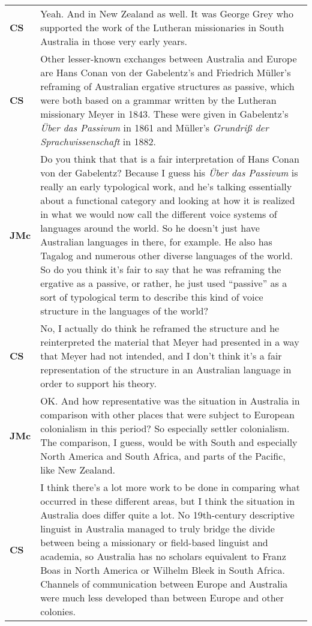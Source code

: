 \documentclass[12pt]{article}
\begin{document}
\begin{flushleft}
\begin{supertabular}{m{0.24415985in}m{5.89766in}}
\textbf{CS}\newline
 &
Yeah. And in New Zealand as well. It was George Grey who supported the work of the Lutheran missionaries in South Australia in those very early years.\\
\textbf{CS}\newline
 &
Other lesser-known exchanges between Australia and Europe are Hans Conan von der Gabelentz’s and Friedrich Müller’s reframing of Australian ergative structures as passive, which were both based on a grammar written by the Lutheran missionary Meyer in 1843. These were given in Gabelentz’s \textit{Über das Passivum} in 1861 and Müller’s \textit{Grundriß der Sprachwissenschaft} in 1882.\\
\textbf{JMc}\newline
 &
Do you think that that is a fair interpretation of Hans Conan von der Gabelentz? Because I guess his \textit{Über das Passivum} is really an early typological work, and he’s talking essentially about a functional category and looking at how it is realized in what we would now call the different voice systems of languages around the world. So he doesn’t just have Australian languages in there, for example. He also has Tagalog and numerous other diverse languages of the world. So do you think it’s fair to say that he was reframing the ergative as a passive, or rather, he just used “passive” as a sort of typological term to describe this kind of voice structure in the languages of the world?\\
\textbf{CS}\newline
 &
No, I actually do think he reframed the structure and he reinterpreted the material that Meyer had presented in a way that Meyer had not intended, and I don’t think it’s a fair representation of the structure in an Australian language in order to support his theory.\\
\textbf{JMc}\newline
 &
OK. And how representative was the situation in Australia in comparison with other places that were subject to European colonialism in this period? So especially settler colonialism. The comparison, I guess, would be with South and especially North America and South Africa, and parts of the Pacific, like New Zealand.\\
\textbf{CS}\newline
 &
I think there’s a lot more work to be done in comparing what occurred in these different areas, but I think the situation in Australia does differ quite a lot. No 19th-century descriptive linguist in Australia managed to truly bridge the divide between being a missionary or field-based linguist and academia, so Australia has no scholars equivalent to Franz Boas in North America or Wilhelm Bleek in South Africa. Channels of communication between Europe and Australia were much less developed than between Europe and other colonies.\\

\end{supertabular}
\end{flushleft}
\end{document}
